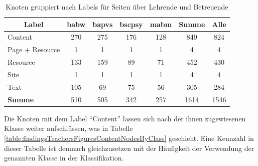     \begin{table}[htb]
        \centering
        \begin{tabular}{|l|c|c|c|c|c|c|}
            \hline
            \multicolumn{1}{|c|}{\textbf{Label}} & \textbf{\gls{babw}} & \textbf{\gls{bapvs}} & \textbf{\gls{bscpsy}} & \textbf{\gls{mabm}} & \textbf{Summe} & \textbf{Alle} \\ \hline
            Content                                     & 270           & 275            & 176             & 128           & 849            & 824           \\ \hline
            Page + Resource                             & 1             & 1              & 1               & 1             & 4              & 4             \\ \hline
            Resource                                    & 133           & 159            & 89              & 71            & 452            & 430           \\ \hline
            Site                                        & 1             & 1              & 1               & 1             & 4              & 4             \\ \hline
            Text                                        & 105           & 69             & 75              & 56            & 305            & 284           \\ \hline
            \hline
            \textbf{Summe}                              & 510           & 505            & 342             & 257           & 1614           & 1546          \\ \hline
        \end{tabular}
        \caption{Knoten gruppiert nach Labels für Seiten über Lehrende und Betreuende}
        \label{table:findingsTeachersFiguresNodesByLabel}
    \end{table}

    Die Knoten mit dem Label "`Content"' lassen sich nach der ihnen zugewiesenen Klasse
    weiter aufschlüssen, was in Tabelle \ref{table:findingsTeachersFiguresContentNodesByClass} geschieht.
    Eine Kennzahl in dieser Tabelle ist demnach gleichzusetzen mit der Häufigkeit der Verwendung
    der genannten Klasse in der Klassifikation.

